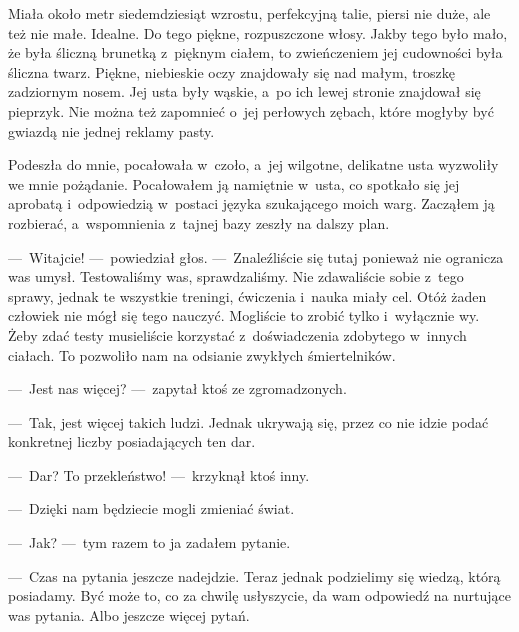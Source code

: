 Miała około metr siedemdziesiąt wzrostu, perfekcyjną talie, piersi nie duże, ale też nie małe. Idealne. Do tego 
piękne, rozpuszczone włosy. Jakby tego było mało, że była śliczną brunetką z~pięknym ciałem, to zwieńczeniem jej 
cudowności była śliczna twarz. Piękne, niebieskie oczy znajdowały się nad małym, troszkę zadziornym nosem. Jej usta 
były wąskie, a~po ich lewej stronie znajdował się pieprzyk. Nie można też zapomnieć o~jej perłowych zębach, które 
mogłyby być gwiazdą nie jednej reklamy pasty.

Podeszła do mnie, pocałowała w~czoło, a~jej wilgotne, delikatne usta wyzwoliły we mnie pożądanie. Pocałowałem ją 
namiętnie w~usta, co spotkało się jej aprobatą i~odpowiedzią w~postaci języka szukającego moich warg. Zacząłem ją 
rozbierać, a~wspomnienia z~tajnej bazy zeszły na dalszy plan.

---~Witajcie! ---~powiedział głos. ---~Znaleźliście się tutaj ponieważ nie ogranicza was umysł. Testowaliśmy was, 
sprawdzaliśmy. Nie zdawaliście sobie z~tego sprawy, jednak te wszystkie treningi, ćwiczenia i~nauka miały cel. Otóż 
żaden człowiek nie mógł się tego nauczyć. Mogliście to zrobić tylko i~wyłącznie wy. Żeby zdać testy musieliście 
korzystać z~doświadczenia zdobytego w~innych ciałach. To pozwoliło nam na odsianie zwykłych śmiertelników.

---~Jest nas więcej? ---~zapytał ktoś ze zgromadzonych.

---~Tak, jest więcej takich ludzi. Jednak ukrywają się, przez co nie idzie podać konkretnej liczby posiadających ten 
dar.

---~Dar? To przekleństwo! ---~krzyknął ktoś inny.

---~Dzięki nam będziecie mogli zmieniać świat.

---~Jak? ---~tym razem to ja zadałem pytanie.

---~Czas na pytania jeszcze nadejdzie. Teraz jednak podzielimy się wiedzą, którą posiadamy. Być może to, co za chwilę 
usłyszycie, da wam odpowiedź na nurtujące was pytania. Albo jeszcze więcej pytań.

